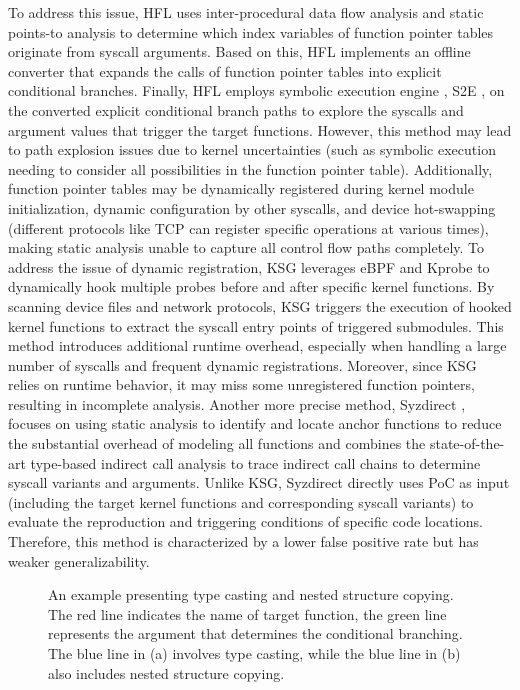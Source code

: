 To address this issue, HFL \cite{kim2020hfl} uses inter-procedural data flow analysis and static points-to analysis to determine which index variables of function pointer tables originate from syscall arguments. Based on this, HFL implements an offline converter that expands the calls of function pointer tables into explicit conditional branches. Finally, HFL employs symbolic execution engine , S2E \cite{Chipounov2011S2EAP}, on the converted explicit conditional branch paths to explore the syscalls and argument values that trigger the target functions. However, this method may lead to path explosion issues due to kernel uncertainties (such as symbolic execution needing to consider all possibilities in the function pointer table). Additionally, function pointer tables may be dynamically registered during kernel module initialization, dynamic configuration by other syscalls, and device hot-swapping (\eg different protocols like TCP can register specific operations at various times), making static analysis unable to capture all control flow paths completely. To address the issue of dynamic registration, KSG leverages eBPF \cite{eBPF} and Kprobe \cite{Kprobe} to dynamically hook multiple probes before and after specific kernel functions. By scanning device files and network protocols, KSG triggers the execution of hooked kernel functions to extract the syscall entry points of triggered submodules. This method introduces additional runtime overhead, especially when handling a large number of syscalls and frequent dynamic registrations. Moreover, since KSG relies on runtime behavior, it may miss some unregistered function pointers, resulting in incomplete analysis. Another more precise method, Syzdirect \cite{tan2023syzdirect}, focuses on using static analysis to identify and locate anchor functions to reduce the substantial overhead of modeling all functions and combines the state-of-the-art type-based indirect call analysis \cite{Lu2019WhereDI} to trace indirect call chains to determine syscall variants and arguments. Unlike KSG, Syzdirect directly uses PoC as input (including the target kernel functions and corresponding syscall variants) to evaluate the reproduction and triggering conditions of specific code locations. Therefore, this method is characterized by a lower false positive rate but has weaker generalizability.

  \begin{figure*}[!t]
    \centering
    \hspace{5pt}\vline\hspace{5pt}
    \caption{An example presenting type casting and nested structure copying. The red line indicates the name of target function, the green line represents the argument that determines the conditional branching. The blue line in (a) involves type casting, while the blue line in (b) also includes nested structure copying.}
  \end{figure*}

